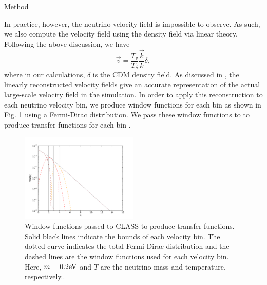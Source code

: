 \begin{section}{Method}
\par In practice, however, the neutrino velocity field is 
impossible to observe. As such, we also compute the velocity 
field using the density field via linear theory. Following 
the above discussion, we have
\begin{equation}
   \vec{v} = \frac{T_{v}}{T_{\delta}}\frac{\vec{k}}{k}\delta,
\end{equation}
where in our calculations, $\delta$ is the CDM density field. 
As discussed in \cite{bib:Inman}, the linearly reconstructed velocity fields 
give an accurate representation of the actual large-scale velocity 
field in the simulation. In order to apply this reconstruction 
to each neutrino velocity bin, we produce window functions for
each bin as shown in Fig. \ref{fig:fdwindow} using a Fermi-Dirac
distribution. We pass these window functions to \class{} to
produce transfer functions for each bin \cite{bib:Blas}.

\begin{figure}[tbp]
  \begin{center}
    \includegraphics[width=0.5\textwidth]{./figures/fdwindow.pdf}
    \caption{Window functions passed to CLASS to produce transfer functions.
	     Solid black lines indicate the bounds of each velocity bin. The dotted
	     curve indicates the total Fermi-Dirac distribution and the dashed lines
	     are the window functions used for each velocity bin. Here, $m=0.2{\rm eV}{}$ and $T$ 
	     are the neutrino mass and temperature, respectively..}
    \label{fig:fdwindow}
  \end{center}
\end{figure}
   

\end{section}
